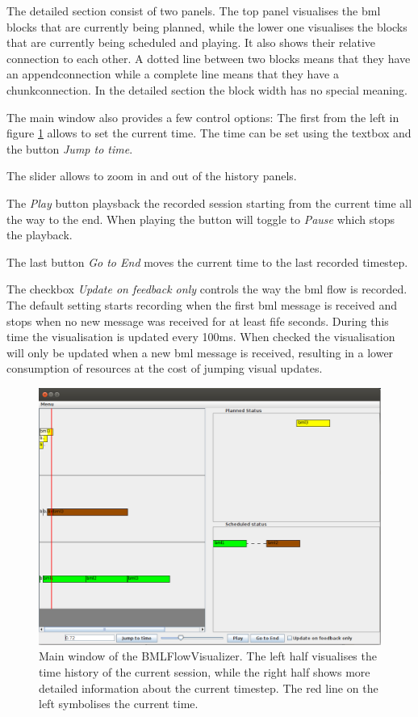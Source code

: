 \documentclass[12pt,a4paper]{article}
\begin{document}
The detailed section consist of two panels. The top panel visualises the bml blocks that are currently being planned, while the lower one visualises the blocks that are 
currently being scheduled and playing. It also shows their relative connection to each other. A dotted line between two blocks means that they have an \glqq append\grqq connection
while a complete line means that they have a \glqq chunk\grqq connection. In the detailed section the block width has no special meaning.

The main window also provides a few control options: The first from the left in figure \ref{fig:overview} allows to set the current time. The time can be set using the textbox and the button \textit{Jump to time}. 

The slider allows to zoom in and out of the history panels. 

The \textit{Play} button \glqq plays\grqq back the recorded session starting from the current time all the way to the end. When playing the button will toggle to \textit{Pause} which stops the playback. 

The last button \textit{Go to End} moves the current time to the last recorded timestep.

The checkbox \textit{Update on feedback only} controls the way the bml flow is recorded. The default setting starts recording when the first bml message is received and stops when no new message was received for at least fife seconds. During this time the visualisation is updated every 100ms. When checked the visualisation will only be updated when a new bml message is received, resulting in a lower consumption of resources at the cost of jumping visual updates.

\begin{figure}[!htb]
\centering
 \includegraphics[width=\textwidth]{images/bmlFlowOverview.png}
 \caption{Main window of the BMLFlowVisualizer. The left half visualises the time history of the current session, while the right half shows more detailed information
 about the current timestep. The red line on the left symbolises the current time.}
 \label{fig:overview}
\end{figure}
\end{document}

